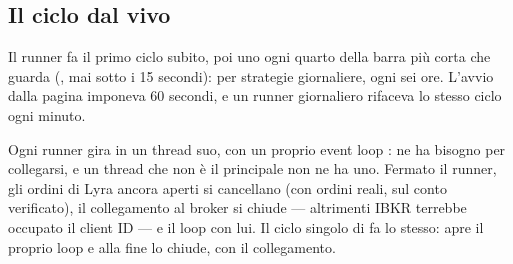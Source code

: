 \subsection{Il ciclo dal vivo}

Il runner fa il primo ciclo subito, poi uno ogni quarto della barra più
corta che guarda (, mai sotto i \num{15}
secondi): per strategie giornaliere, ogni sei ore. L'avvio dalla pagina
imponeva \num{60} secondi, e un runner giornaliero rifaceva lo stesso ciclo
ogni minuto.

\noindent
Ogni runner gira in un thread suo, con un proprio event loop
:  ne ha bisogno per collegarsi, e un thread
che non è il principale non ne ha uno. Fermato il runner, gli ordini di Lyra
ancora aperti si cancellano (con ordini reali, sul conto verificato), il
collegamento al broker si chiude --- altrimenti IBKR terrebbe occupato il
client ID --- e il loop con lui. Il ciclo singolo di
 fa lo stesso: apre il proprio loop e alla fine lo
chiude, con il collegamento.

